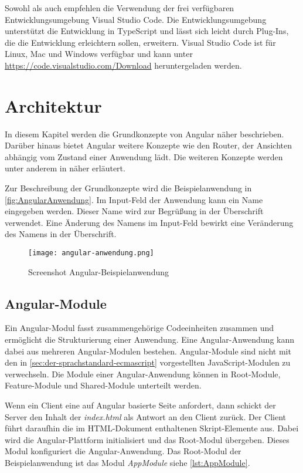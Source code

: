Sowohl \textcite[vgl.][3\psqq]{Woiwode.2018} als auch \textcite[vgl.][3\psqq]{Steyer.2017} empfehlen die Verwendung der frei verfügbaren Entwicklungsumgebung Visual Studio Code. Die Entwicklungsumgebung unterstützt die Entwicklung in TypeScript und lässt sich leicht durch Plug-Ins, die die Entwicklung erleichtern sollen, erweitern. Visual Studio Code ist für Linux, Mac und Windows verfügbar und kann unter \url{https://code.visualstudio.com/Download}  heruntergeladen werden.


\section{Architektur}
In diesem Kapitel werden die Grundkonzepte von Angular näher beschrieben. Darüber hinaus bietet Angular weitere Konzepte wie den Router, der Ansichten abhängig vom Zustand einer Anwendung lädt.\autocites[vgl.][109]{Steyer.2017}  Die weiteren Konzepte werden unter anderem in \textcites{Woiwode.2018}{Steyer.2017} näher erläutert.

\label{BeschreibungHelloBsp}
Zur Beschreibung der Grundkonzepte wird die Beispielanwendung in \autoref{fig:AngularAnwendung}. Im Input-Feld der Anwendung kann ein Name eingegeben werden. Dieser Name wird zur Begrüßung in der Überschrift verwendet. Eine Änderung des Namens im Input-Feld bewirkt eine Veränderung des Namens in der Überschrift.

\begin{figure}[h]
	\centering
	\texttt{[image: angular-anwendung.png]}
	\caption{Screenshot Angular-Beispielanwendung} 
	\label{fig:AngularAnwendung}
\end{figure}


\subsection{Angular-Module}

Ein Angular-Modul fasst zusammengehörige Codeeinheiten zusammen und ermöglicht die Strukturierung einer Anwendung. Eine Angular-Anwendung kann dabei aus mehreren Angular-Modulen bestehen. Angular-Module sind nicht mit den in \autoref{sec:der-sprachstandard-ecmascript} vorgestellten JavaScript-Modulen zu verwechseln. \autocites[vgl.][103\psqq]{Steyer.2017}[vgl.][301\psqq]{Woiwode.2018} Die Module einer Angular-Anwendung können in Root-Module, Feature-Module und Shared-Module unterteilt werden.

 
Wenn ein Client eine auf Angular basierte Seite anfordert, dann schickt der Server den Inhalt der \textit{index.html} als Antwort an den Client zurück. Der Client führt daraufhin die im HTML-Dokument enthaltenen Skript-Elemente aus. Dabei wird die Angular-Plattform initialisiert und das Root-Modul übergeben. Dieses Modul konfiguriert die Angular-Anwendung.\autocites[vgl.][60]{Steyer.2017}[vgl.][226\psqq]{Freeman.2018}  Das Root-Modul der Beispielanwendung ist das Modul \textit{AppModule} siehe \autoref{lst:AppModule}. 

